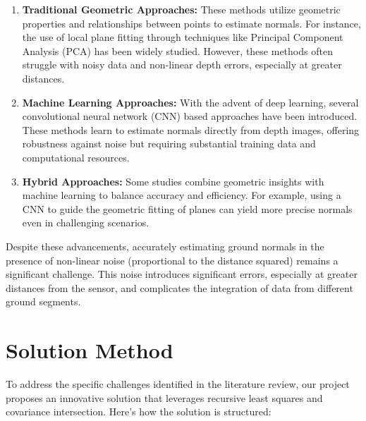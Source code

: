 \documentclass[12pt,a4paper,oneside,onecolumn]{book}
\begin{document}
\begin{enumerate}
    \item \textbf{Traditional Geometric Approaches:} These methods utilize geometric properties and relationships between points to estimate normals. For instance, the use of local plane fitting through techniques like Principal Component Analysis (PCA) has been widely studied. However, these methods often struggle with noisy data and non-linear depth errors, especially at greater distances.
    
    \item \textbf{Machine Learning Approaches:} With the advent of deep learning, several convolutional neural network (CNN) based approaches have been introduced. These methods learn to estimate normals directly from depth images, offering robustness against noise but requiring substantial training data and computational resources.
    
    \item \textbf{Hybrid Approaches:} Some studies combine geometric insights with machine learning to balance accuracy and efficiency. For example, using a CNN to guide the geometric fitting of planes can yield more precise normals even in challenging scenarios.
\end{enumerate}

Despite these advancements, accurately estimating ground normals in the presence of non-linear noise (proportional to the distance squared) remains a significant challenge. This noise introduces significant errors, especially at greater distances from the sensor, and complicates the integration of data from different ground segments.


\chapter{Solution Method}

To address the specific challenges identified in the literature review, our project proposes an innovative solution that leverages recursive least squares and covariance intersection. Here’s how the solution is structured:
\end{document}
